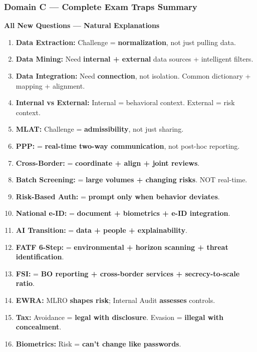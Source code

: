 \documentclass[12pt,aspectratio=169]{beamer}
\renewcommand{\scriptsize}{\fontsize{4.5}{5.5}\selectfont}
\begin{document}
	\begin{frame}
		\frametitle{\fontsize{11}{13}\selectfont \textbf{Domain C — Complete Exam Traps Summary}}
		\scriptsize
		\begin{block}{\fontsize{7}{9}\selectfont \textbf{All New Questions — Natural Explanations}}
			\scriptsize
			\begin{enumerate}
				\item \textbf{Data Extraction:} Challenge = \textbf{normalization}, not just pulling data.
				\item \textbf{Data Mining:} Need \textbf{internal + external} data sources + intelligent filters.
				\item \textbf{Data Integration:} Need \textbf{connection}, not isolation. Common dictionary + mapping + alignment.
				\item \textbf{Internal vs External:} Internal = behavioral context. External = risk context.
				\item \textbf{MLAT:} Challenge = \textbf{admissibility}, not just sharing.
				\item \textbf{PPP:} = \textbf{real-time two-way communication}, not post-hoc reporting.
				\item \textbf{Cross-Border:} = \textbf{coordinate + align + joint reviews}.
				\item \textbf{Batch Screening:} = \textbf{large volumes + changing risks}. NOT real-time.
				\item \textbf{Risk-Based Auth:} = \textbf{prompt only when behavior deviates}.
				\item \textbf{National e-ID:} = \textbf{document + biometrics + e-ID integration}.
				\item \textbf{AI Transition:} = \textbf{data + people + explainability}.
				\item \textbf{FATF 6-Step:} = \textbf{environmental + horizon scanning + threat identification}.
				\item \textbf{FSI:} = \textbf{BO reporting + cross-border services + secrecy-to-scale ratio}.
				\item \textbf{EWRA:} MLRO \textbf{shapes risk}; Internal Audit \textbf{assesses} controls.
				\item \textbf{Tax:} Avoidance = \textbf{legal with disclosure}. Evasion = \textbf{illegal with concealment}.
				\item \textbf{Biometrics:} Risk = \textbf{can't change like passwords}.

\end{enumerate}
\end{block}
\end{frame}
\end{document}

